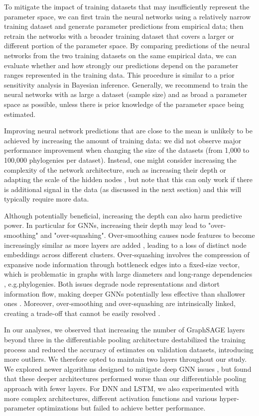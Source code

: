 {To mitigate the impact of training datasets that may insufficiently represent the parameter space, we can first train the neural networks using a relatively narrow training dataset and generate parameter predictions from empirical data; then retrain the networks with a broader training dataset that covers a larger or different portion of the parameter space. By comparing predictions of the neural networks from the two training datasets on the same empirical data, we can evaluate whether and how strongly our predictions depend on the parameter ranges represented in the training data. This procedure is similar to a prior sensitivity analysis in Bayesian inference. Generally, we recommend to train the neural networks with as large a dataset (sample size) and as broad a parameter space as possible, unless there is prior knowledge of the parameter space being estimated.

Improving neural network predictions that are close to the mean is unlikely to be achieved by increasing the amount of training data: we did not observe major performance improvement when changing the size of the datasets (from 1,000 to 100,000 phylogenies per dataset). Instead, one might consider increasing the complexity of the network architecture, such as increasing their depth or adapting the scale of the hidden nodes \citep{zhang_evaluating_2021}, but note that this can only work if there is additional signal in the data (as discussed in the next section) and this will typically require more data.

Although potentially beneficial, increasing the depth can also harm predictive power. In particular for GNNs, increasing their depth may lead to "over-smoothing" and "over-squashing". Over-smoothing causes node features to become increasingly similar as more layers are added \citep{li_deeper_2018}, leading to a loss of distinct node embeddings across different clusters. Over-squashing involves the compression of expansive node information through bottleneck edges into a fixed-size vector, which is problematic in graphs with large diameters and long-range dependencies \citep{alon_bottleneck_2021}, e.g.phylogenies. Both issues degrade node representations and distort information flow, making deeper GNNs potentially less effective than shallower ones \citep{dwivedi_long_2022}. Moreover, over-smoothing and over-squashing are intrinsically linked, creating a trade-off that cannot be easily resolved \citep{giraldo_trade-off_2023}.

In our analyses, we observed that increasing the number of GraphSAGE layers beyond three in the differentiable pooling architecture destabilized the training process and reduced the accuracy of estimates on validation datasets, introducing more outliers. We therefore opted to maintain two layers throughout our study. We explored newer algorithms designed to mitigate deep GNN issues \citep{li_deeper_2018, chen_simple_2020, gravina_anti-symmetric_2022}, but found that these deeper architectures performed worse than our differentiable pooling approach with fewer layers. For DNN and LSTM, we also experimented with more complex architectures, different activation functions and various hyper-parameter optimizations but failed to achieve better performance. 

}

